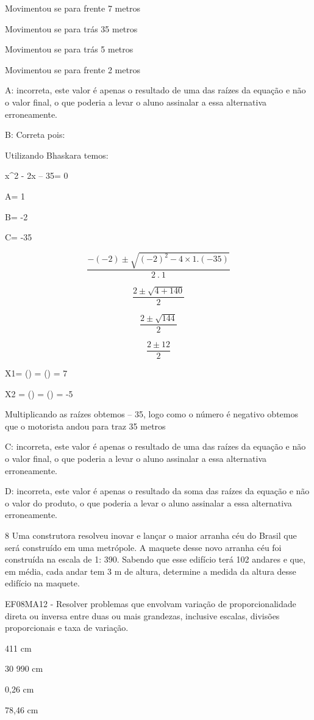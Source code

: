 \item Movimentou se para frente 7 metros
\item Movimentou se para trás 35 metros
\item Movimentou se para trás 5 metros
\item Movimentou se para frente 2 metros

A: incorreta, este valor é apenas o resultado de uma das raízes da
equação e não o valor final, o que poderia a levar o aluno assinalar a
essa alternativa erroneamente.

B: Correta pois:

Utilizando Bhaskara temos:

x^2 - 2x -- 35= 0

A= 1

B= -2

C= -35

\[\frac{- ( - 2) \pm \sqrt{{( - 2)}^{2} - 4\times 1.( - 35)}}{2\ .\ 1}\]

\[\frac{2 \pm \sqrt{4 + 140}}{2}\]

\[\frac{2 \pm \sqrt{144}}{2}\]

\[\frac{2 \pm 12}{2}\]

X1= () = () = 7

X2 = () = () = -5

Multiplicando as raízes obtemos -- 35, logo como o número é negativo
obtemos que o motorista andou para traz 35 metros

C: incorreta, este valor é apenas o resultado de uma das raízes da
equação e não o valor final, o que poderia a levar o aluno assinalar a
essa alternativa erroneamente.

D: incorreta, este valor é apenas o resultado da soma das raízes da
equação e não o valor do produto, o que poderia a levar o aluno
assinalar a essa alternativa erroneamente.

\num{8} Uma construtora resolveu inovar e lançar o maior arranha céu do
Brasil que será construído em uma metrópole. A maquete desse novo
arranha céu foi construída na escala de 1: 390. Sabendo que esse
edifício terá 102 andares e que, em média, cada andar tem 3 m de altura,
determine a medida da altura desse edifício na maquete.

EF08MA12 - Resolver problemas que envolvam variação de proporcionalidade
direta ou inversa entre duas ou mais grandezas, inclusive escalas,
divisões proporcionais e taxa de variação.

\item 411 cm
\item 30 990 cm
\item 0,26 cm
\item 78,46 cm

